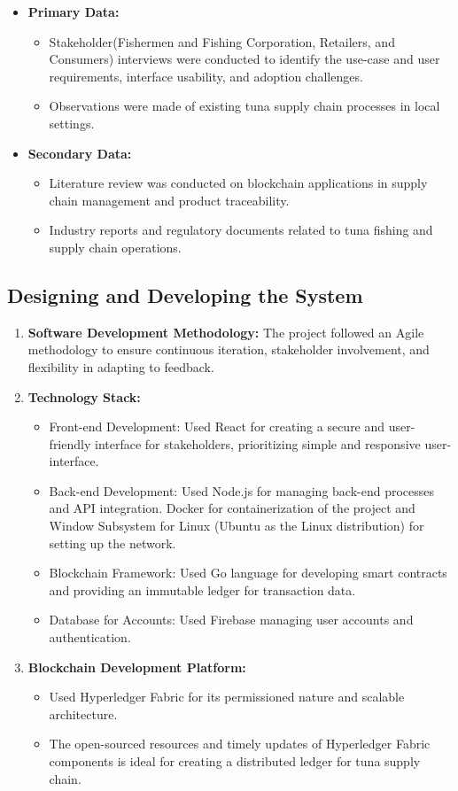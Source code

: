 \begin{itemize}
	\item \textbf{Primary Data:} 
	\begin{itemize}
		\item Stakeholder(Fishermen and Fishing Corporation, Retailers, and Consumers) interviews were conducted to identify the use-case and user requirements, interface usability, and adoption challenges.
		\item Observations were made of existing tuna supply chain processes in local settings.
	\end{itemize}
	\item \textbf{Secondary Data:} 
	\begin{itemize}
		\item Literature review was conducted on blockchain applications in supply chain management and product traceability.
		\item Industry reports and regulatory documents related to tuna fishing and supply chain operations.
	\end{itemize}
\end{itemize}

\subsection{Designing and Developing the System}

\begin{enumerate}
	\item \textbf{Software Development Methodology:} The project followed an Agile methodology to ensure continuous iteration, stakeholder involvement, and flexibility in adapting to feedback.
	\item \textbf{Technology Stack:} 
		\begin{itemize}
			\item Front-end Development: Used React for creating a secure and user-friendly interface for stakeholders, prioritizing simple and responsive user-interface.
			\item Back-end Development: Used Node.js for managing back-end processes and API integration. Docker for containerization of the project and Window Subsystem for Linux (Ubuntu as the Linux distribution) for setting up the network.
			\item Blockchain Framework: Used Go language for developing smart contracts and providing an immutable ledger for transaction data.
			\item Database for Accounts: Used Firebase managing user accounts and authentication.
		\end{itemize}
	\item \textbf{Blockchain Development Platform:} 
		\begin{itemize}
			\item Used Hyperledger Fabric for its permissioned nature and scalable architecture.
			\item The open-sourced resources and timely updates of Hyperledger Fabric components is ideal for creating a distributed ledger for tuna supply chain.
		\end{itemize}
\end{enumerate}

